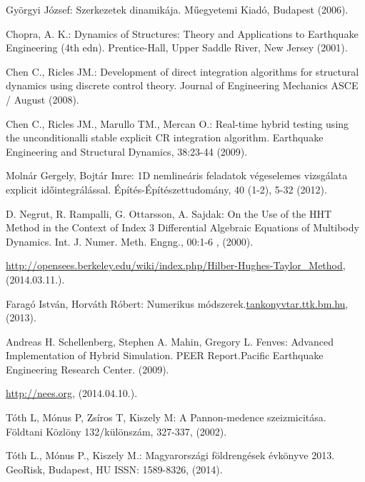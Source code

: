 \documentclass[a4paper,12pt]{report}
\begin{document}
\begin{thebibliography}{1}
\thispagestyle{empty}

 Györgyi József: Szerkezetek dinamikája. Műegyetemi Kiadó, Budapest (2006).
  
 Chopra, A. K.: Dynamics of Structures: Theory and Applications to Earthquake Engineering (4th edn).  Prentice-Hall, Upper Saddle River, New Jersey (2001).


 Chen C., Ricles JM.: Development of direct integration algorithms for structural dynamics using discrete control theory. Journal of Engineering Mechanics \textcopyright ASCE / August (2008).

 Chen C., Ricles JM., Marullo TM., Mercan O.: Real-time hybrid testing using the unconditionalli stable explicit CR integration algorithm. Earthquake Engineering and Structural Dynamics, 38:23-44 (2009). 

 Molnár Gergely, Bojtár Imre: 1D nemlineáris feladatok végeselemes vizsgálata explicit időintegrálással. Építés-Építészettudomány, 40 (1-2), 5-32  (2012).

 D. Negrut, R. Rampalli, G. Ottarsson, A. Sajdak: On the Use of the HHT Method in the Context of Index 3
Differential Algebraic Equations of Multibody Dynamics. Int. J. Numer. Meth. Engng., 00:1-6 , (2000).

\url{ http://opensees.berkeley.edu/wiki/index.php/Hilber-Hughes-Taylor_Method}, (2014.03.11.).

 Faragó István, Horváth Róbert: Numerikus módszerek.\url{tankonyvtar.ttk.bm.hu}, (2013).

 Andreas H. Schellenberg,  Stephen A. Mahin, Gregory L. Fenves: Advanced Implementation of Hybrid Simulation. PEER Report.Pacific Earthquake Engineering Research Center.  (2009).

\url{http://nees.org}, (2014.04.10.).

 Tóth L, Mónus P, Zsíros T, Kiszely M: A Pannon-medence szeizmicitása. Földtani Közlöny 132/különszám, 327-337, (2002).

 Tóth L., Mónus P., Kiszely M.: Magyarországi földrengések évkönyve 2013. GeoRisk, Budapest, HU ISSN: 1589-8326, (2014).


\end{thebibliography}
\end{document}
